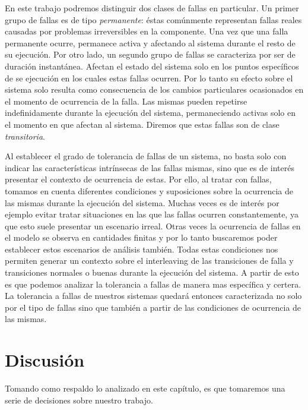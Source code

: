 \documentclass[titlepage, 12pt]{book}
\begin{document}
En este trabajo podremos distinguir dos clases de fallas en particular. Un primer grupo de fallas es de tipo \textit{permanente}: \'estas com\'unmente representan fallas reales causadas por problemas irreversibles en la componente. Una vez que una falla permanente ocurre, permanece activa y afectando al sistema durante el resto de su ejecuci\'on. Por otro lado, un segundo grupo de fallas se caracteriza por ser de duraci\'on instant\'anea. Afectan el estado del sistema solo en los puntos espec\'ificos de se ejecuci\'on en los cuales estas fallas ocurren. Por lo tanto su efecto sobre el sistema solo resulta como consecuencia de los cambios particulares ocasionados en el momento de ocurrencia de la falla. Las mismas pueden repetirse indefinidamente durante la ejecuci\'on del sistema, permaneciendo activas solo en el momento en que afectan al sistema. Diremos que estas fallas son de clase \textit{transitoria}.

Al establecer el grado de tolerancia de fallas de un sistema, no basta solo con indicar las caracter\'isticas intr\'insecas de las fallas mismas, sino que es de inter\'es presentar el contexto de ocurrencia de estas. Por ello, al tratar con fallas, tomamos en cuenta diferentes condiciones y suposiciones sobre la ocurrencia de las mismas durante la ejecuci\'on del sistema. Muchas veces es de inter\'es por ejemplo evitar tratar situaciones en las que las fallas ocurren constantemente, ya que esto suele presentar un escenario irreal. Otras veces la ocurrencia de fallas en el modelo se observa en cantidades finitas y por lo tanto buscaremos poder establecer estos escenarios de an\'alisis tambi\'en. Todas estas condiciones nos permiten generar un contexto sobre el interleaving de las transiciones de falla y transiciones normales o buenas durante la ejecuci\'on del sistema. A partir de esto es que podemos analizar la tolerancia a fallas de manera mas espec\'ifica y certera. La tolerancia a fallas de nuestros sistemas quedar\'a entonces caracterizada no solo por el tipo de fallas sino que tambi\'en a partir de las condiciones de ocurrencia de las mismas.






\section{Discusi\'on}
Tomando como respaldo lo analizado en este cap\'itulo, es que tomaremos una serie de decisiones sobre nuestro trabajo.
\end{document}
